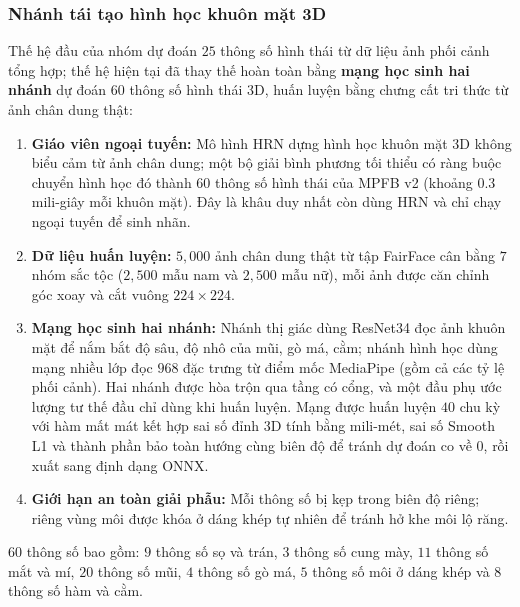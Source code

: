 \subsubsection{Nhánh tái tạo hình học khuôn mặt 3D}
Thế hệ đầu của nhóm dự đoán $25$ thông số hình thái từ dữ liệu ảnh phối cảnh tổng hợp; thế hệ hiện tại đã thay thế hoàn toàn bằng \textbf{mạng học sinh hai nhánh} dự đoán $60$ thông số hình thái 3D, huấn luyện bằng chưng cất tri thức từ ảnh chân dung thật:
\begin{enumerate}
    \item \textbf{Giáo viên ngoại tuyến:} Mô hình HRN \cite{hrn} dựng hình học khuôn mặt 3D không biểu cảm từ ảnh chân dung; một bộ giải bình phương tối thiểu có ràng buộc chuyển hình học đó thành $60$ thông số hình thái của MPFB v2 (khoảng $0.3$ mili-giây mỗi khuôn mặt). Đây là khâu duy nhất còn dùng HRN và chỉ chạy ngoại tuyến để sinh nhãn.
    \item \textbf{Dữ liệu huấn luyện:} $5{,}000$ ảnh chân dung thật từ tập FairFace \cite{fairface} cân bằng $7$ nhóm sắc tộc ($2{,}500$ mẫu nam và $2{,}500$ mẫu nữ), mỗi ảnh được căn chỉnh góc xoay và cắt vuông $224 \times 224$.
    \item \textbf{Mạng học sinh hai nhánh:} Nhánh thị giác dùng ResNet34 \cite{resnet} đọc ảnh khuôn mặt để nắm bắt độ sâu, độ nhô của mũi, gò má, cằm; nhánh hình học dùng mạng nhiều lớp đọc $968$ đặc trưng từ điểm mốc MediaPipe \cite{mediapipe} (gồm cả các tỷ lệ phối cảnh). Hai nhánh được hòa trộn qua tầng có cổng, và một đầu phụ ước lượng tư thế đầu chỉ dùng khi huấn luyện. Mạng được huấn luyện $40$ chu kỳ với hàm mất mát kết hợp sai số đỉnh 3D tính bằng mili-mét, sai số Smooth L1 và thành phần bảo toàn hướng cùng biên độ để tránh dự đoán co về $0$, rồi xuất sang định dạng ONNX.
    \item \textbf{Giới hạn an toàn giải phẫu:} Mỗi thông số bị kẹp trong biên độ riêng; riêng vùng môi được khóa ở dáng khép tự nhiên để tránh hở khe môi lộ răng.
\end{enumerate}
$60$ thông số bao gồm: $9$ thông số sọ và trán, $3$ thông số cung mày, $11$ thông số mắt và mí, $20$ thông số mũi, $4$ thông số gò má, $5$ thông số môi ở dáng khép và $8$ thông số hàm và cằm.

